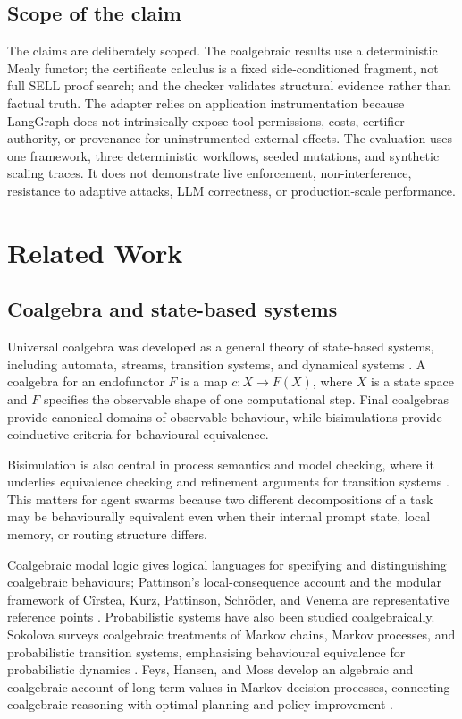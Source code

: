 \documentclass[a4paper,fleqn]{cas-sc}
\begin{document}
\subsection{Scope of the claim}

The claims are deliberately scoped. The coalgebraic results use a deterministic
Mealy functor; the certificate calculus is a fixed side-conditioned fragment,
not full SELL proof search; and the checker validates structural evidence rather
than factual truth. The adapter relies on application instrumentation because
LangGraph does not intrinsically expose tool permissions, costs, certifier
authority, or provenance for uninstrumented external effects. The evaluation
uses one framework, three deterministic workflows, seeded mutations, and
synthetic scaling traces. It does not demonstrate live enforcement,
non-interference, resistance to adaptive attacks, LLM correctness, or
production-scale performance.

\section{Related Work}

\subsection{Coalgebra and state-based systems}

Universal coalgebra was developed as a general theory of state-based systems, including automata, streams, transition systems, and dynamical systems \cite{rutten2000,jacobs2016}. A coalgebra for an endofunctor \(F\) is a map \(c:X\to F(X)\), where \(X\) is a state space and \(F\) specifies the observable shape of one computational step. Final coalgebras provide canonical domains of observable behaviour, while bisimulations provide coinductive criteria for behavioural equivalence.

Bisimulation is also central in process semantics and model checking, where it underlies equivalence checking and refinement arguments for transition systems \cite{hennessy1985,sangiorgi2011,baier2008}. This matters for agent swarms because two different decompositions of a task may be behaviourally equivalent even when their internal prompt state, local memory, or routing structure differs.

Coalgebraic modal logic gives logical languages for specifying and distinguishing coalgebraic behaviours; Pattinson's local-consequence account and the modular framework of Cîrstea, Kurz, Pattinson, Schröder, and Venema are representative reference points \cite{pattinson2003,cirstea2011modal}. Probabilistic systems have also been studied coalgebraically. Sokolova surveys coalgebraic treatments of Markov chains, Markov processes, and probabilistic transition systems, emphasising behavioural equivalence for probabilistic dynamics \cite{sokolova2011}. Feys, Hansen, and Moss develop an algebraic and coalgebraic account of long-term values in Markov decision processes, connecting coalgebraic reasoning with optimal planning and policy improvement \cite{feys2018}.
\end{document}

